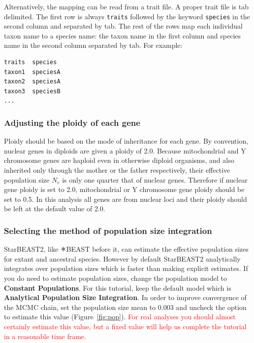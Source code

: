 \documentclass{article}
\newcommand{\Conv}{\mathop{\scalebox{1.5}{$\ast$}}}
\begin{document}
Alternatively, the mapping can be read from a trait file. A proper trait file is
tab delimited. The first row is always \texttt{traits} followed by the keyword
\texttt{species} in the second column and separated by tab. The rest of the rows
map each individual taxon name to a species name: the taxon name in the first
column and species name in the second column separated by tab. For example:

\begin{minipage}[h]{0.7\textwidth}
\begin{verbatim}
traits	species
taxon1	speciesA
taxon2	speciesA
taxon3	speciesB
...
\end{verbatim}
\end{minipage}

\vspace{12pt}

\subsubsection*{Adjusting the ploidy of each gene}

Ploidy should be based on the mode of inheritance for each gene. By convention,
nuclear genes in diploids are given a ploidy of 2.0. Because mitochondrial and Y
chromosome genes are haploid even in otherwise diploid organisms, and also
inherited only through the mother or the father respectively, their effective
population size $N_e$ is only one quarter that of nuclear genes. Therefore if
nuclear gene ploidy is set to 2.0, mitochondrial or Y chromosome gene ploidy
should be set to 0.5. In this analysis all genes are from nuclear loci and their
ploidy should be left at the default value of 2.0.

\clearpage

\subsubsection*{Selecting the method of population size integration}

StarBEAST2, like $\Conv$BEAST before it, can estimate the effective population
sizes for extant and ancestral species. However by default StarBEAST2
analytically integrates over population sizes which is faster than making
explicit estimates. If you do need to estimate population sizes, change the
population model to \textbf{Constant Populations}. For this tutorial, keep the
default model which is \textbf{Analytical Population Size Integration}. In order to improve
convergence of the MCMC chain, set the population size mean to 0.003 and uncheck
the option to estimate this value (Figure~\ref{fig:pop}). \textcolor{red}{For
real analyses you should almost certainly estimate this value, but a fixed value
will help us complete the tutorial in a reasonable time frame.}
\end{document}
